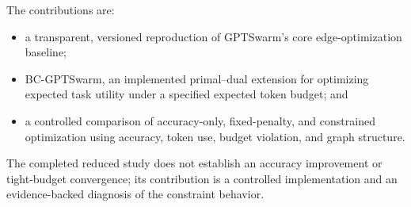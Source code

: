 The contributions are:
\begin{itemize}
    \item a transparent, versioned reproduction of GPTSwarm's core edge-optimization baseline;
    \item BC-GPTSwarm, an implemented primal--dual extension for optimizing expected task utility under a specified expected token budget; and
    \item a controlled comparison of accuracy-only, fixed-penalty, and constrained optimization using accuracy, token use, budget violation, and graph structure.
\end{itemize}

The completed reduced study does not establish an accuracy improvement or tight-budget convergence; its contribution is a controlled implementation and an evidence-backed diagnosis of the constraint behavior.
